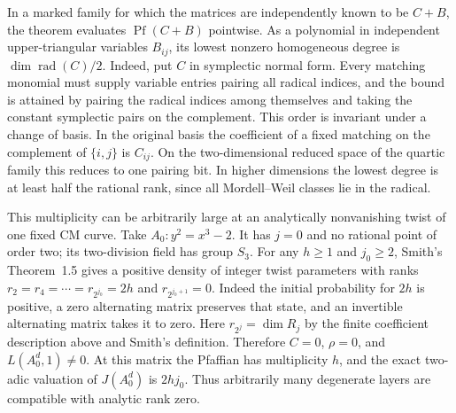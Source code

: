 \documentclass[11pt]{article}
\begin{document}
In a marked family for which the matrices are independently known to be
$C+B$, the theorem evaluates $\operatorname{Pf}(C+B)$ pointwise.
As a polynomial in independent upper-triangular variables $B_{ij}$, its
lowest nonzero homogeneous degree is $\dim\operatorname{rad}(C)/2$.
Indeed, put $C$ in symplectic normal form. Every matching monomial must
supply variable entries pairing all radical indices, and the bound is
attained by pairing the radical indices among themselves and taking the
constant symplectic pairs on the complement. This order is invariant
under a change of basis. In the original basis the coefficient of a
fixed matching on the complement of $\{i,j\}$ is $C_{ij}$. On the
two-dimensional reduced space of the quartic family this reduces to
one pairing bit. In higher dimensions the lowest degree is at least
half the rational rank, since all Mordell--Weil classes lie in the
radical.

This multiplicity can be arbitrarily large at an analytically
nonvanishing twist of one fixed CM curve. Take $A_0:y^2=x^3-2$.
It has $j=0$ and no rational point of order two; its two-division field
has group $S_3$. For any $h\ge1$ and $j_0\ge2$, Smith's Theorem~1.5
\cite{pfSmith} gives a positive density of integer twist parameters
with ranks $r_2=r_4=\cdots=r_{2^{j_0}}=2h$ and
$r_{2^{j_0+1}}=0$. Indeed the initial probability for $2h$ is
positive, a zero alternating matrix preserves that state, and an
invertible alternating matrix takes it to zero. Here $r_{2^j}=\dim R_j$
by the finite coefficient description above and Smith's definition.
Therefore $C=0$, $\rho=0$, and $L(A_0^d,1)\ne0$. At this matrix the
Pfaffian has multiplicity $h$, and the exact two-adic valuation of
$J(A_0^d)$ is $2hj_0$. Thus arbitrarily many degenerate layers are
compatible with analytic rank zero.
\end{document}
